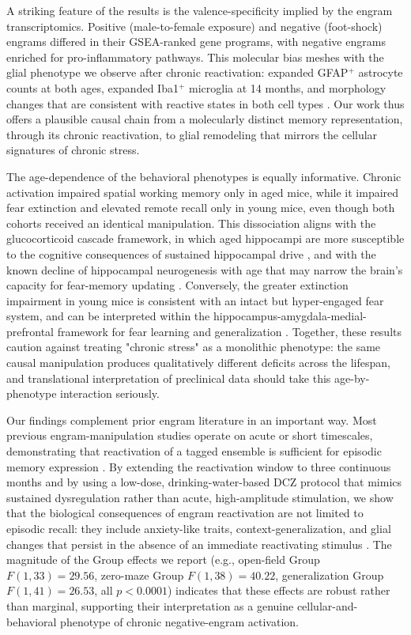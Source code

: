 \documentclass[11pt]{article}
\begin{document}
A striking feature of the results is the valence-specificity implied by the engram transcriptomics. Positive (male-to-female exposure) and negative (foot-shock) engrams differed in their GSEA-ranked gene programs, with negative engrams enriched for pro-inflammatory pathways. This molecular bias meshes with the glial phenotype we observe after chronic reactivation: expanded GFAP$^{+}$ astrocyte counts at both ages, expanded Iba1$^{+}$ microglia at 14 months, and morphology changes that are consistent with reactive states in both cell types \citep{york2018threedmorph}. Our work thus offers a plausible causal chain from a molecularly distinct memory representation, through its chronic reactivation, to glial remodeling that mirrors the cellular signatures of chronic stress.

The age-dependence of the behavioral phenotypes is equally informative. Chronic activation impaired spatial working memory only in aged mice, while it impaired fear extinction and elevated remote recall only in young mice, even though both cohorts received an identical manipulation. This dissociation aligns with the glucocorticoid cascade framework, in which aged hippocampi are more susceptible to the cognitive consequences of sustained hippocampal drive \citep{sapolsky1986glucocorticoid}, and with the known decline of hippocampal neurogenesis with age that may narrow the brain's capacity for fear-memory updating \citep{klempin2007neurogenesis}. Conversely, the greater extinction impairment in young mice is consistent with an intact but hyper-engaged fear system, and can be interpreted within the hippocampus-amygdala-medial-prefrontal framework for fear learning and generalization \citep{maren2013contextual,tovote2015circuits}. Together, these results caution against treating "chronic stress" as a monolithic phenotype: the same causal manipulation produces qualitatively different deficits across the lifespan, and translational interpretation of preclinical data should take this age-by-phenotype interaction seriously.

Our findings complement prior engram literature in an important way. Most previous engram-manipulation studies operate on acute or short timescales, demonstrating that reactivation of a tagged ensemble is sufficient for episodic memory expression \citep{liu2012engram,redondo2014valence,ramirez2015positive,josselyn2020engram}. By extending the reactivation window to three continuous months and by using a low-dose, drinking-water-based DCZ protocol that mimics sustained dysregulation rather than acute, high-amplitude stimulation, we show that the biological consequences of engram reactivation are not limited to episodic recall: they include anxiety-like traits, context-generalization, and glial changes that persist in the absence of an immediate reactivating stimulus \citep{nagai2020dcz,roth2016dreadds,denardo2019temporal}. The magnitude of the Group effects we report (e.g., open-field Group $F(1,33)=29.56$, zero-maze Group $F(1,38)=40.22$, generalization Group $F(1,41)=26.53$, all $p<0.0001$) indicates that these effects are robust rather than marginal, supporting their interpretation as a genuine cellular-and-behavioral phenotype of chronic negative-engram activation.
\end{document}
